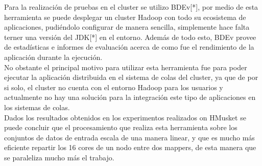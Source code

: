 \documentclass[conference]{IEEEtran}
\begin{document}
Para la realización de pruebas en el cluster se utilizo BDEv[*], por medio de esta herramienta se puede desplegar un cluster Hadoop con todo su ecosistema de aplicaciones, pudiéndolo configurar de manera sencilla, simplemente hace falta terner una versión del JDK[*] en el entorno. Además de todo esto, BDEv provee de estadísticas e informes de evaluación acerca de como fue el rendimiento de la aplicación durante la ejecución.\\
No obstante el principal motivo para utilizar esta herramienta fue para poder ejecutar la aplicación distribuida en el sistema de colas del cluster, ya que de por si solo, el cluster no cuenta con el entorno Hadoop para los usuarios y actualmente no hay una solución para la integración este tipo de aplicaciones en los sistemas de colas.\\


Dados los resultados obtenidos en los experimentos realizados on HMusket se puede concluir que el procesamiento que realiza esta herramienta sobre los conjuntos de datos de entrada escala de una manera linear, y que es mucho más eficiente repartir los 16 cores de un nodo entre dos mappers, de esta manera que se paraleliza mucho más el trabajo.\\
\end{document}
